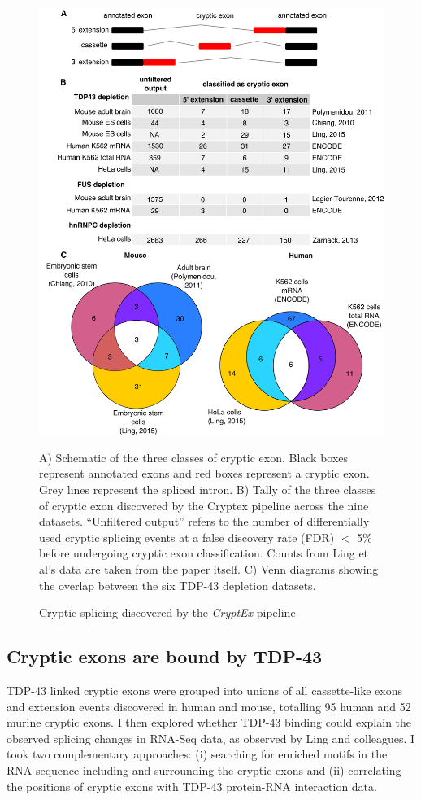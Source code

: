 \begin{figure}[h!]
  	\begin{center}
  		\includegraphics[width=14cm]{Figures/03_cryptic_exons/Figure_1_venn_inkscape.png}
  	\end{center}
	\caption{Cryptic splicing discovered by the \emph{CryptEx} pipeline}
		A) Schematic of the three classes of cryptic exon. Black boxes represent annotated exons and red boxes represent a cryptic exon. Grey lines represent the spliced intron. B) Tally of the three classes of cryptic exon discovered by the Cryptex pipeline across the nine datasets. ``Unfiltered output'' refers to the number of differentially used cryptic splicing events at a false discovery rate (FDR) $<$ 5\% before undergoing cryptic exon classification. Counts from Ling et al's data are taken from the paper itself. C) Venn diagrams showing the overlap between the six TDP-43 depletion datasets.
\end{figure}


\subsection{Cryptic exons are bound by TDP-43}
TDP-43 linked cryptic exons were grouped into unions of all cassette-like exons and extension events discovered in human and mouse, totalling 95 human and 52 murine cryptic exons. I then explored whether TDP-43 binding could explain the observed splicing changes in RNA-Seq data, as observed by Ling and colleagues. I took two complementary approaches: (i) searching for enriched motifs in the RNA sequence including and surrounding the cryptic exons and (ii) correlating the positions of cryptic exons with TDP-43 protein-RNA interaction data.

